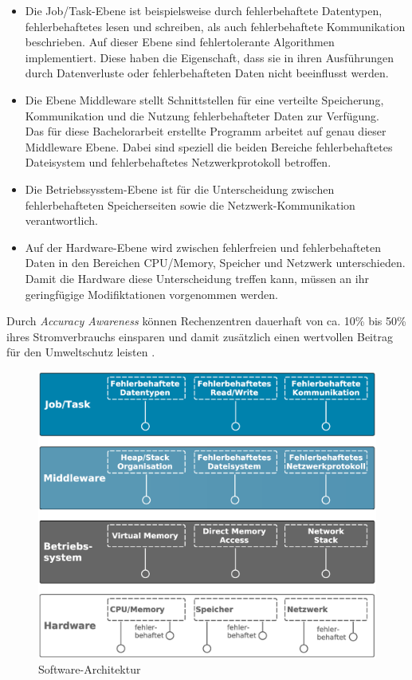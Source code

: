 \begin{itemize}
	\item Die Job/Task-Ebene ist beispielsweise durch fehlerbehaftete Datentypen, fehlerbehaftetes lesen und schreiben, als auch fehlerbehaftete Kommunikation beschrieben. Auf dieser Ebene sind fehlertolerante Algorithmen implementiert. Diese haben die Eigenschaft, dass sie in ihren Ausf\"uhrungen durch Datenverluste oder fehlerbehafteten Daten nicht beeinflusst werden.
	\item Die Ebene Middleware stellt Schnittstellen f\"ur eine verteilte Speicherung, Kommunikation und die Nutzung fehlerbehafteter Daten zur Verf\"ugung.\\
	 Das f\"ur diese Bachelorarbeit erstellte Programm arbeitet auf genau dieser Middleware Ebene. Dabei sind speziell die beiden Bereiche fehlerbehaftetes Dateisystem und fehlerbehaftetes Netzwerkprotokoll betroffen.
	\item Die Betriebssysstem-Ebene ist f\"ur die Unterscheidung zwischen fehlerbehafteten Speicherseiten sowie die Netzwerk-Kommunikation verantwortlich.
	\item Auf der Hardware-Ebene wird zwischen fehlerfreien und fehlerbehafteten Daten in den Bereichen CPU/Memory, Speicher und Netzwerk unterschieden. Damit die Hardware diese Unterscheidung treffen kann, m\"ussen an ihr geringf\"ugige Modifiktationen vorgenommen werden. 
\end{itemize} 

Durch \textit{Accuracy Awareness} k\"onnen Rechenzentren dauerhaft von ca. 10\% bis 50\% ihres Stromverbrauchs einsparen und damit zus\"atzlich einen wertvollen Beitrag f\"ur den Umweltschutz leisten \cite{Graubner2012Energy-efficient}.

\begin{figure}[!htb]
\includegraphics[scale=0.47]{graphics/AccuracyAwareness.eps}
\centering
 \caption[AccuracyAwareness: Software-Architektur]{Software-Architektur \cite{Graubner2012Energy-efficient}}
 \label{SoftwareStack}
\end{figure}

